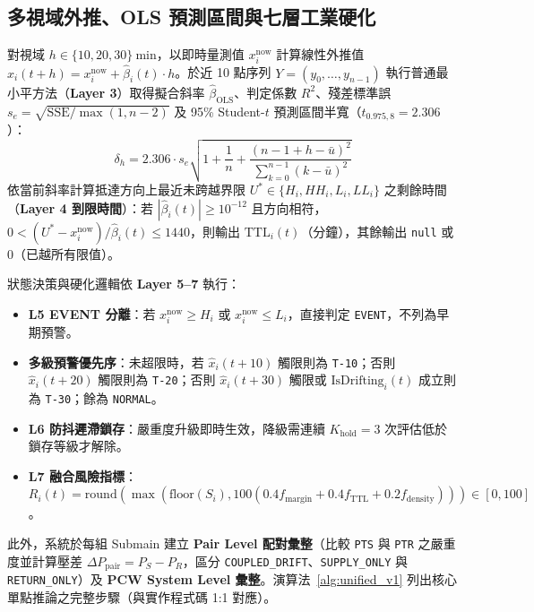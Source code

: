 \documentclass[fontset=none, a4paper, 12pt]{ctexart}
\begin{document}
\begin{doublespace}
\subsection{多視域外推、OLS 預測區間與七層工業硬化}
對視域 $h \in \{10, 20, 30\}\ \mathrm{min}$，以即時量測值 $x_i^{\mathrm{now}}$ 計算線性外推值 $\hat{x}_i(t+h) = x_i^{\mathrm{now}} + \hat{\beta}_i(t)\cdot h$。於近 10 點序列 $Y=(y_0,\dots,y_{n-1})$ 執行普通最小平方法（\textbf{Layer 3}）取得擬合斜率 $\hat{\beta}_{\mathrm{OLS}}$、判定係數 $R^2$、殘差標準誤 $s_e = \sqrt{\mathrm{SSE}/\max(1, n-2)}$ 及 95\% Student-$t$ 預測區間半寬（$t_{0.975,8}=2.306$）：
\begin{equation}
\delta_h = 2.306 \cdot s_e \sqrt{1 + \frac{1}{n} + \frac{(n - 1 + h - \bar{u})^2}{\sum_{k=0}^{n-1}(k-\bar{u})^2}}
\end{equation}
依當前斜率計算抵達方向上最近未跨越界限 $U^* \in \{H_i, HH_i, L_i, LL_i\}$ 之剩餘時間（\textbf{Layer 4 到限時間}）：若 $|\hat{\beta}_i(t)| \ge 10^{-12}$ 且方向相符，$0 < (U^* - x_i^{\mathrm{now}})/\hat{\beta}_i(t) \le 1440$，則輸出 $\mathrm{TTL}_i(t)$（分鐘），其餘輸出 \texttt{null} 或 $0$（已越所有限值）。

狀態決策與硬化邏輯依 \textbf{Layer 5–7} 執行：
\begin{itemize}
    \item \textbf{L5 EVENT 分離}：若 $x_i^{\mathrm{now}} \ge H_i$ 或 $x_i^{\mathrm{now}} \le L_i$，直接判定 \texttt{EVENT}，不列為早期預警。
    \item \textbf{多級預警優先序}：未超限時，若 $\hat{x}_i(t+10)$ 觸限則為 \texttt{T-10}；否則 $\hat{x}_i(t+20)$ 觸限則為 \texttt{T-20}；否則 $\hat{x}_i(t+30)$ 觸限或 $\mathrm{IsDrifting}_i(t)$ 成立則為 \texttt{T-30}；餘為 \texttt{NORMAL}。
    \item \textbf{L6 防抖遲滯鎖存}：嚴重度升級即時生效，降級需連續 $K_{\mathrm{hold}}=3$ 次評估低於鎖存等級才解除。
    \item \textbf{L7 融合風險指標}：$R_i(t) = \mathrm{round}(\max(\mathrm{floor}(S_i), 100(0.4 f_{\mathrm{margin}} + 0.4 f_{\mathrm{TTL}} + 0.2 f_{\mathrm{density}}))) \in [0, 100]$。
\end{itemize}
此外，系統於每組 Submain 建立 \textbf{Pair Level 配對彙整}（比較 \texttt{PTS} 與 \texttt{PTR} 之嚴重度並計算壓差 $\Delta P_{\mathrm{pair}} = P_S - P_R$，區分 \texttt{COUPLED\_DRIFT}、\texttt{SUPPLY\_ONLY} 與 \texttt{RETURN\_ONLY}）及 \textbf{PCW System Level 彙整}。演算法~\ref{alg:unified_v1} 列出核心單點推論之完整步驟（與實作程式碼 1:1 對應）。


\end{doublespace}
\end{document}
